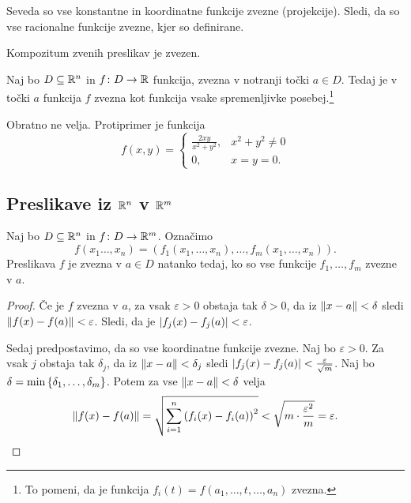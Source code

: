 \obvs

\begin{opomba}
Seveda so vse konstantne in koordinatne funkcije zvezne (projekcije). Sledi, da so vse racionalne funkcije zvezne, kjer so definirane.
\end{opomba}

\begin{opomba}
Kompozitum zvenih preslikav je zvezen.
\end{opomba}

\begin{izrek}
Naj bo $D\subseteq\mathbb{R}^n$ in $f\colon D\to\mathbb{R}$ funkcija, zvezna v notranji točki $a\in D$. Tedaj je v točki $a$ funkcija $f$ zvezna kot funkcija vsake spremenljivke posebej.\footnote{To pomeni, da je funkcija $f_i(t)=f(a_1,\dots,t,\dots,a_n)$ zvezna.}
\end{izrek}

\obvs

\begin{opomba}
Obratno ne velja. Protiprimer je funkcija
\[
f(x,y)=\begin{cases}
\frac{2xy}{x^2+y^2},& x^2+y^2\ne 0 \\
0,& x=y=0.
\end{cases}
\]
\end{opomba}

\newpage

\subsection{Preslikave iz $\mathbb{R}^n$ v $\mathbb{R}^m$}

\begin{trditev}
Naj bo $D\subseteq\mathbb{R}^n$ in $f\colon D\to\mathbb{R}^m$. Označimo
\[
f(x_1\dots,x_n)=\left(f_1(x_1,\dots,x_n),\dots,f_m(x_1,\dots,x_n)\right).
\]
Preslikava $f$ je zvezna v $a\in D$ natanko tedaj, ko so vse funkcije $f_1,\dots,f_m$ zvezne v $a$.
\end{trditev}

\begin{proof}
Če je $f$ zvezna v $a$, za vsak $\varepsilon>0$ obstaja tak $\delta>0$, da iz $\left\lVert x-a\right\rVert<\delta$ sledi $\left\lVert f(x)-f(a)\right\rVert<\varepsilon$. Sledi, da je $\left\lvert f_j(x)-f_j(a)\right\rvert<\varepsilon$.

Sedaj predpostavimo, da so vse koordinatne funkcije zvezne. Naj bo $\varepsilon>0$. Za vsak $j$ obstaja tak $\delta_j$, da iz $\left\lVert x-a\right\rVert<\delta_j$ sledi $\left\lvert f_j(x)-f_j(a)\right\rvert<\frac{\varepsilon}{\sqrt{m}}$. Naj bo $\delta=\min\left\{\delta_1,\dots,\delta_m\right\}$. Potem za vse $\left\lVert x-a\right\rVert<\delta$ velja
\[
\left\lVert f(x)-f(a)\right\rVert=\sqrt{\sum_{i=1}^n\left(f_i(x)-f_i(a)\right)^2}<\sqrt{m\cdot\frac{\varepsilon^2}{m}}=\varepsilon.\qedhere
\]
\end{proof}

